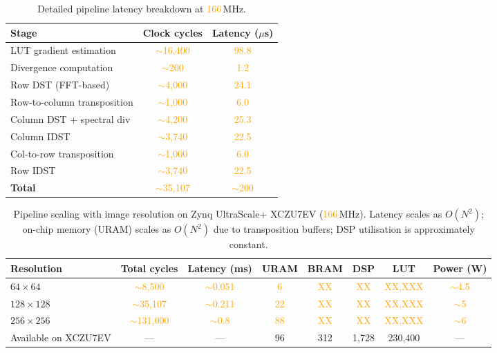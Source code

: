 \documentclass[10pt,a4paper]{article}
\newcommand{\placeholder}[1]{\textcolor{orange}{#1}}
\newcommand{\clockMHz}{\placeholder{166}}
\begin{document}
\begin{table}[h]
\caption{Detailed pipeline latency breakdown at \clockMHz\,MHz.}
\label{tab:ed_latency}
\centering
\begin{tabular}{@{}lcc@{}}
\toprule
Stage & Clock cycles & Latency ($\mu$s) \\
\midrule
LUT gradient estimation    & \placeholder{$\sim$16,400} & \placeholder{98.8} \\
Divergence computation     & \placeholder{$\sim$200}    & \placeholder{1.2} \\
Row DST (FFT-based)        & \placeholder{$\sim$4,000}  & \placeholder{24.1} \\
Row-to-column transposition& \placeholder{$\sim$1,000}  & \placeholder{6.0} \\
Column DST + spectral div  & \placeholder{$\sim$4,200}  & \placeholder{25.3} \\
Column IDST                & \placeholder{$\sim$3,740}  & \placeholder{22.5} \\
Col-to-row transposition   & \placeholder{$\sim$1,000}  & \placeholder{6.0} \\
Row IDST                   & \placeholder{$\sim$3,740}  & \placeholder{22.5} \\
\midrule
\textbf{Total}             & \placeholder{$\sim$35,107} & \placeholder{$\sim$200} \\
\bottomrule
\end{tabular}
\end{table}

\begin{table}[h]
\caption{Pipeline scaling with image resolution on Zynq UltraScale+ XCZU7EV (\clockMHz\,MHz). Latency scales as $O(N^2)$; on-chip memory (URAM) scales as $O(N^2)$ due to transposition buffers; DSP utilisation is approximately constant.}
\label{tab:ed_scaling}
\centering
\begin{tabular}{@{}lccccccc@{}}
\toprule
Resolution & Total cycles & Latency (ms) & URAM & BRAM & DSP & LUT & Power (W) \\
\midrule
$64 \times 64$   & \placeholder{$\sim$8{,}500}   & \placeholder{$\sim$0.051} & \placeholder{6}  & \placeholder{XX} & \placeholder{XX} & \placeholder{XX{,}XXX} & \placeholder{$\sim$4.5} \\
$128 \times 128$  & \placeholder{$\sim$35{,}107}  & \placeholder{$\sim$0.211} & \placeholder{22} & \placeholder{XX} & \placeholder{XX} & \placeholder{XX{,}XXX} & \placeholder{$\sim$5}   \\
$256 \times 256$  & \placeholder{$\sim$131{,}000} & \placeholder{$\sim$0.8}   & \placeholder{88} & \placeholder{XX} & \placeholder{XX} & \placeholder{XX{,}XXX} & \placeholder{$\sim$6}   \\
\midrule
Available on XCZU7EV & --- & --- & 96 & 312 & 1{,}728 & 230{,}400 & --- \\
\bottomrule
\end{tabular}
\end{table}
\end{document}

